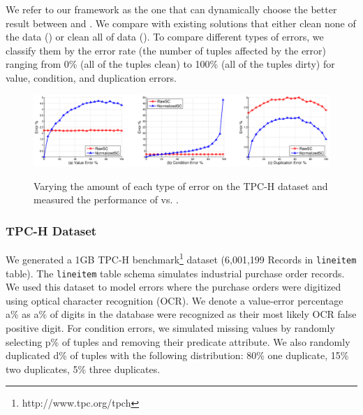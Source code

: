 We refer to our framework \saqpplus as the one that can dynamically choose the better result between \biascorrected and \sampleclean. We compare \saqpplus with existing solutions that either clean none of the data (\alldirty) or clean all of data (\allclean). 
To compare different types of errors, we classify them by the error rate (the number of tuples affected by the error) ranging from 0\% (all of the tuples clean) to 100\% (all of the tuples dirty) for value, condition, and duplication errors.
\begin{figure}[t] \vspace{-2em}
\centering
\hspace*{-2em}\includegraphics[scale=0.35]{exp/allerror-percent.eps}\\ \vspace{-1em}
\caption{Varying the amount of each type of error on the TPC-H dataset and measured the performance of \bias vs. \sampleclean.}
\label{exp:all-errorpercent}
\end{figure}

\subsubsection{TPC-H Dataset} \label{exp:tpch}
We generated a 1GB TPC-H benchmark\footnote{\scriptsize http://www.tpc.org/tpch} dataset (6,001,199 Records in \texttt{lineitem} table).
The \texttt{lineitem} table schema simulates industrial purchase order records.
We used this dataset to model errors where the purchase orders were digitized using optical character recognition (OCR).
We denote a value-error percentage a\% as a\% of digits in the database were recognized as their most likely OCR false positive digit.
For condition errors, we simulated missing values by randomly selecting p\% of tuples and removing their predicate attribute.
We also randomly duplicated d\% of tuples with the following distribution: 80\% one duplicate, 15\% two duplicates, 5\% three duplicates.

